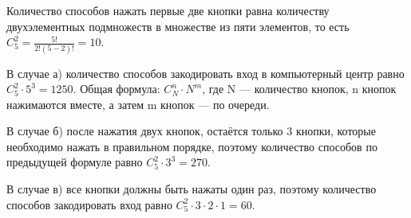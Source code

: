 \documentclass{book}
\begin{document}
Количество способов нажать первые две кнопки равна количеству двухэлементных подмножеств в множестве из пяти элементов, то есть $C_5^2=\frac{5!}{2!\left(5-2\right)!}=10$.

В случае а) количество способов закодировать вход в компьютерный центр равно $C_5^2\cdot 5^3=1250$. Общая формула: $C_N^n\cdot N^m$, где N --- количество кнопок, n кнопок нажимаются вместе, а затем m кнопок --- по очереди.

В случае б) после нажатия двух кнопок, остаётся только 3 кнопки, которые необходимо нажать в правильном порядке, поэтому количество способов по предыдущей формуле равно $C_5^2\cdot 3^3=270$.

В случае в) все кнопки должны быть нажаты один раз, поэтому количество способов закодировать вход равно $C_5^2\cdot 3\cdot 2\cdot 1=60$.
\end{document}
